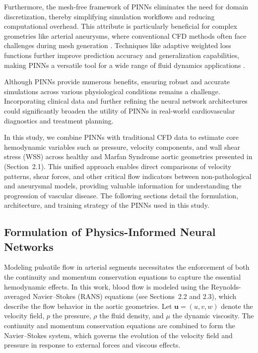 \documentclass[12pt, a4paper]{article}
\begin{document}
Furthermore, the mesh-free framework of PINNs eliminates the need for domain discretization, thereby simplifying simulation workflows and reducing computational overhead. This attribute is particularly beneficial for complex geometries like arterial aneurysms, where conventional CFD methods often face challenges during mesh generation \citep{zhang2024meshless, bhargava2024enhancing}. Techniques like adaptive weighted loss functions further improve prediction accuracy and generalization capabilities, making PINNs a versatile tool for a wide range of fluid dynamics applications \citep{liu2024variable}.

Although PINNs provide numerous benefits, ensuring robust and accurate simulations across various physiological conditions remains a challenge. Incorporating clinical data and further refining the neural network architectures could significantly broaden the utility of PINNs in real-world cardiovascular diagnostics and treatment planning.

In this study, we combine PINNs with traditional CFD data to estimate core hemodynamic variables such as pressure, velocity components, and wall shear stress (WSS) across healthy and Marfan Syndrome aortic geometries presented in (Section~2.1). This unified approach enables direct comparisons of velocity patterns, shear forces, and other critical flow indicators between non-pathological and aneurysmal models, providing valuable information for understanding the progression of vascular disease. The following sections detail the formulation, architecture, and training strategy of the PINNs used in this study.

\subsection{Formulation of Physics-Informed Neural Networks}
\label{sec:PINN_Formulation}

Modeling pulsatile flow in arterial segments necessitates the enforcement of both the continuity and momentum conservation equations to capture the essential hemodynamic effects. In this work, blood flow is modeled using the Reynolds-averaged Navier–Stokes (RANS) equations (see Sections~2.2 and 2.3), which describe the flow behavior in the aortic geometries. Let \(\mathbf{u} = (u,v,w)\) denote the velocity field, \(p\) the pressure, \(\rho\) the fluid density, and \(\mu\) the dynamic viscosity. The continuity and momentum conservation equations are combined to form the Navier–Stokes system, which governs the evolution of the velocity field and pressure in response to external forces and viscous effects.
\end{document}
